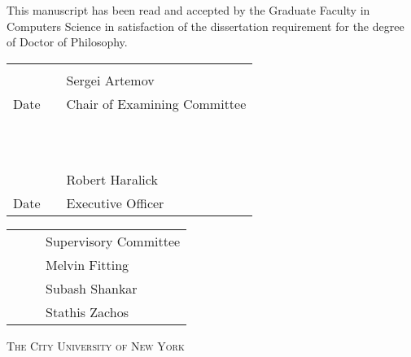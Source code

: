\begin{center}

\vspace{.5in}
This manuscript has been read and accepted by the Graduate Faculty 
in Computers Science in satisfaction of the dissertation requirement for the degree of Doctor of Philosophy.
\end{center}

\vspace{1.0in}

\begin{tabular}{p{1.75in}p{0.5in}p{3.5in}}
\hrulefill                          & &\hrulefill \\
~	  			     & & Sergei Artemov\\
Date                                & & Chair of Examining Committee\\
~                                   & & \\

~                                   & & \\
\hrulefill                          & &\hrulefill \\
~                                   & & Robert Haralick\\
Date                                & & Executive Officer\\
\end{tabular}

\vspace{0.75in}

\begin{tabular}{p{1.75in}p{0.5in}p{3.5in}}
~ 				& &  Supervisory Committee \\
~ 				& &  Melvin Fitting \\
~				& &  Subash Shankar \\
~				& &  Stathis Zachos \\
\end{tabular}


\vspace{\fill}
\begin{center}
\textsc{The City University of New York}
\end{center}